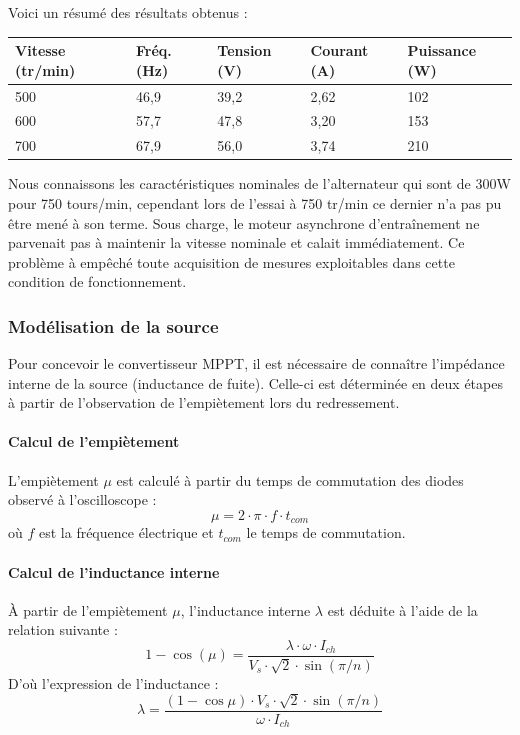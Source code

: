 Voici un résumé des résultats obtenus :

\begin{tableau}[H]
    \centering
    \begin{tabularx}{\textwidth}{X X X X X}
        \toprule
        \textbf{Vitesse (tr/min)} & \textbf{Fréq. (Hz)} & \textbf{Tension (V)} & \textbf{Courant (A)} & \textbf{Puissance (W)} \\
        \midrule
        500 & 46,9 & 39,2 & 2,62 & 102 \\
        600 & 57,7 & 47,8 & 3,20 & 153 \\
        700 & 67,9 & 56,0 & 3,74 & 210 \\
        \bottomrule
    \end{tabularx}
    \caption{Caractéristiques en charge après redressement}
    \label{tab:recap_charge}
\end{tableau}

Nous connaissons les caractéristiques  nominales de l’alternateur qui sont de 300W pour 750 tours/min, cependant lors de l’essai à 750 tr/min ce dernier n’a pas pu être mené à son terme. Sous charge, le moteur asynchrone d’entraînement ne parvenait pas à maintenir la vitesse nominale et calait immédiatement. Ce problème à empêché toute acquisition de mesures exploitables dans cette condition de fonctionnement.

\subsubsection{Modélisation de la source}
Pour concevoir le convertisseur MPPT, il est nécessaire de connaître l'impédance interne de la source (inductance de fuite). Celle-ci est déterminée en deux étapes à partir de l'observation de l'empiètement lors du redressement.

\paragraph{Calcul de l'empiètement}
L'empiètement $\mu$ est calculé à partir du temps de commutation des diodes observé à l'oscilloscope :
\begin{equation*}
    \mu = 2 \cdot \pi \cdot f \cdot t_{com}
\end{equation*}
où $f$ est la fréquence électrique et $t_{com}$ le temps de commutation.

\paragraph{Calcul de l'inductance interne}
À partir de l'empiètement $\mu$, l'inductance interne $\lambda$ est déduite à l'aide de la relation suivante :
\begin{equation*}
    1 - \cos(\mu) = \frac{\lambda \cdot \omega \cdot I_{ch}}{V_s \cdot \sqrt{2} \cdot \sin(\pi/n)}
\end{equation*}
D'où l'expression de l'inductance :
\begin{equation*}
    \lambda = \frac{(1 - \cos\mu) \cdot V_s \cdot \sqrt{2} \cdot \sin(\pi/n)}{\omega \cdot I_{ch}}
\end{equation*}

